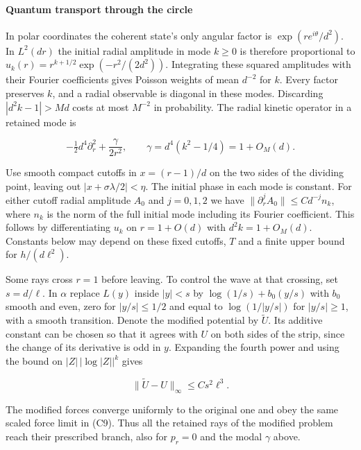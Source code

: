 \documentclass[11pt,a4paper]{article}
\begin{document}
\paragraph{Quantum transport through the
circle}\label{quantum-transport-through-the-circle}

In polar coordinates the coherent state's only angular factor is
\(\exp(r e^{i\theta}/d^2)\). In \(L^2(dr)\) the initial radial amplitude
in mode \(k\ge0\) is therefore proportional to
\(u_k(r)=r^{k+1/2}\exp(-r^2/(2d^2))\). Integrating these squared
amplitudes with their Fourier coefficients gives Poisson weights of mean
\(d^{-2}\) for \(k\). Every factor preserves \(k\), and a radial
observable is diagonal in these modes. Discarding \(|d^2k-1|>Md\) costs
at most \(M^{-2}\) in probability. The radial kinetic operator in a
retained mode is

\[
 -\tfrac12 d^4\partial_r^2+\frac{\gamma}{2r^2},
 \qquad \gamma=d^4(k^2-1/4)=1+O_M(d).
\]

Use smooth compact cutoffs in \(x=(r-1)/d\) on the two sides of the
dividing point, leaving out \(|x+\sigma\lambda/2|<\eta\). The initial
phase in each mode is constant. For either cutoff radial amplitude
\(A_0\) and \(j=0,1,2\) we have
\(\|\partial_r^j A_0\|\le C d^{-j} n_k\), where \(n_k\) is the norm of
the full initial mode including its Fourier coefficient. This follows by
differentiating \(u_k\) on \(r=1+O(d)\) with \(d^2k=1+O_M(d)\).
Constants below may depend on these fixed cutoffs, \(T\) and a finite
upper bound for \(h/(d\ell^2)\).

Some rays cross \(r=1\) before leaving. To control the wave at that
crossing, set \(s=d/\ell\). In \(\alpha\) replace \(L(y)\) inside
\(|y|<s\) by \(\log(1/s)+b_0(y/s)\) with \(b_0\) smooth and even, zero
for \(|y/s|\le1/2\) and equal to \(\log(1/|y/s|)\) for \(|y/s|\ge 1\),
with a smooth transition. Denote the modified potential by
\(\widetilde U\). Its additive constant can be chosen so that it agrees
with \(U\) on both sides of the strip, since the change of its
derivative is odd in \(y\). Expanding the fourth power and using the
bound on \(|Z|\,|\log |Z||^k\) gives

\[
 \|\widetilde U-U\|_\infty\le C s^2\ell^3 .
 \tag{C10}
\]

The modified forces converge uniformly to the original one and obey the
same scaled force limit in (C9). Thus all the retained rays of the
modified problem reach their prescribed branch, also for \(p_r=0\) and
the modal \(\gamma\) above.
\end{document}
